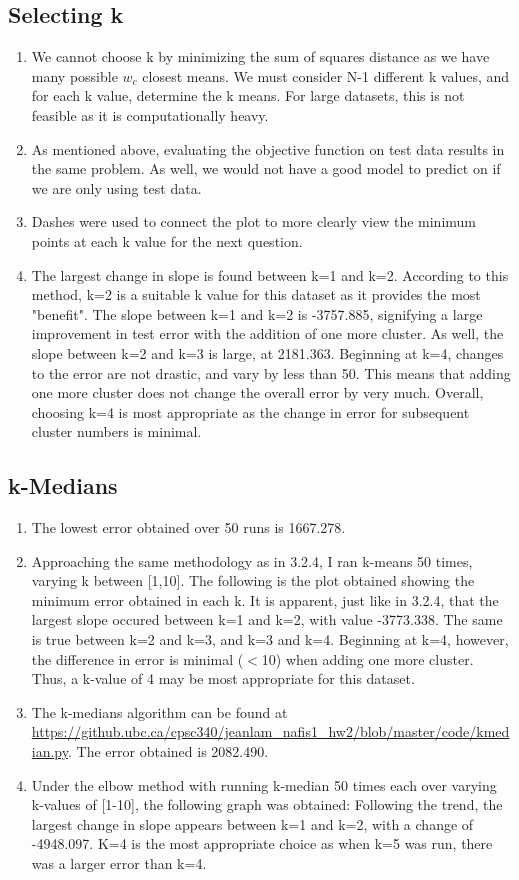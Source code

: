 \documentclass{article}
\begin{document}
\subsection{Selecting k}
\begin{enumerate}
\item We cannot choose k by minimizing the sum of squares distance as we have many possible ${w_c}$ closest means. We must consider N-1 different k values, and for each k value, determine the k means. For large datasets, this is not feasible as it is computationally heavy. 
\item As mentioned above, evaluating the objective function on test data results in the same problem. As well, we would not have a good model to predict on if we are only using test data.
\item {} Dashes were used to connect the plot to more clearly view the minimum points at each k value for the next question. 
\item The largest change in slope is found between k=1 and k=2. According to this method, k=2 is a suitable k value for this dataset as it provides the most "benefit". The slope between k=1 and k=2 is -3757.885, signifying a large improvement in test error with the addition of one more cluster. As well, the slope between k=2 and k=3 is large, at 2181.363. Beginning at k=4, changes to the error are not drastic, and vary by less than 50. This means that adding one more cluster does not change the overall error by very much. Overall, choosing k=4 is most appropriate as the change in error for subsequent cluster numbers is minimal. 
\end{enumerate}
\subsection{k-Medians}
\begin{enumerate}
\item {} The lowest error obtained over 50 runs is 1667.278.
\item Approaching the same methodology as in 3.2.4, I ran k-means 50 times, varying k between [1,10]. The following is the plot obtained showing the minimum error obtained in each k.  It is apparent, just like in 3.2.4, that the largest slope occured between k=1 and k=2, with value -3773.338. The same is true between k=2 and k=3, and k=3 and k=4. Beginning at k=4, however, the difference in error is minimal (${<}$10) when adding one more cluster. Thus, a k-value of 4 may be most appropriate for this dataset.
\item The k-medians algorithm can be found at \url{https://github.ubc.ca/cpsc340/jeanlam_nafis1_hw2/blob/master/code/kmedian.py}. The error obtained is 2082.490.
\item Under the elbow method with running k-median 50 times each over varying k-values of [1-10], the following graph was obtained:  Following the trend, the largest change in slope appears between k=1 and k=2, with a change of -4948.097. K=4 is the most appropriate choice as when k=5 was run, there was a larger error than k=4. 
\end{enumerate}
\end{document}
